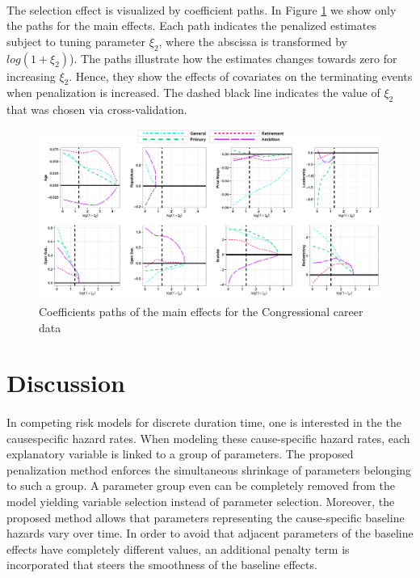 \documentclass[]{article}
\begin{document}
       \paragraph{}The selection effect is visualized by coefficient paths. In Figure \ref{Figure4} we show only the paths for the main effects. Each path indicates the penalized estimates subject to tuning parameter $\xi_2$, where the abscissa is transformed by $log(1+\xi_2)$). The paths illustrate how the estimates changes towards zero for increasing $\xi_2$. Hence, they show the effects of covariates on the terminating events when penalization is increased. The dashed black line indicates the value of  $\xi_2$ that was chosen via cross-validation.
       \begin{figure}
           \centering
           \includegraphics[width=\linewidth]{./Figure4.png}
           \caption{Coefficients paths of the main effects for the Congressional career data}
           \label{Figure4}
        \end{figure} 
       
        
    \section{Discussion}
        \paragraph{}In competing risk models for discrete duration time, one is interested in the the causespecific hazard rates. When modeling these cause-specific hazard rates, each explanatory
        variable is linked to a group of parameters. The proposed penalization method enforces the simultaneous shrinkage of parameters belonging to such a group. A parameter group even can be completely removed from the model yielding variable selection instead of parameter selection. Moreover, the proposed method allows that parameters representing the cause-specific baseline hazards vary over time. In order to avoid that adjacent parameters of the baseline effects have completely different values, an additional penalty term is incorporated that steers the smoothness of the baseline effects.
\end{document}
